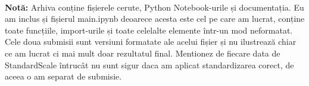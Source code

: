 \documentclass{article}
\begin{document}
\paragraph{} \textbf{Notă:} Arhiva conține fișierele cerute, Python Notebook-urile și documentația. Eu am inclus și fișierul main.ipynb deoarece acesta este cel pe care am lucrat, conține toate funcțiile, import-urile și toate celelalte elemente într-un mod neformatat. Cele doua submisii sunt versiuni formatate ale acelui fișier și nu ilustrează chiar ce am lucrat ci mai mult doar rezultatul final. Mentionez de fiecare data de StandardScale întrucât nu sunt sigur daca am aplicat standardizarea corect, de aceea o am separat de submisie.
 
 
 
\end{document}

